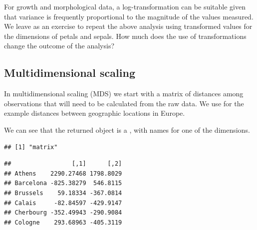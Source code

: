 \documentclass[krantz2]{krantz}\usepackage{knitr}%
\begin{document}
\begin{playground}
For growth and morphological data, a log-transformation can be suitable given that variance is frequently proportional to the magnitude of the values measured. We leave as an exercise to repeat the above analysis using transformed values for the dimensions of petals and sepals. How much does the use of transformations change the outcome of the analysis?
\end{playground}

\subsection{Multidimensional scaling}\label{sec:stat:MDS}

In multidimensional scaling (MDS) we start with a matrix of distances among observations that will need to be calculated from the raw data. We use for the example distances between geographic locations in Europe.

\begin{knitrout}\footnotesize
{}\color{fgcolor}\begin{kframe}
\begin{alltt}
 \hlkwb{<-} 
\end{alltt}
\end{kframe}
\end{knitrout}

We can see that the returned object  is a , with names for one of the dimensions.

\begin{knitrout}\footnotesize
{}\color{fgcolor}\begin{kframe}
\begin{alltt}
\end{alltt}
\begin{verbatim}
## [1] "matrix"
\end{verbatim}
\begin{alltt}
\end{alltt}
\begin{verbatim}
##                 [,1]      [,2]
## Athens    2290.27468 1798.8029
## Barcelona -825.38279  546.8115
## Brussels    59.18334 -367.0814
## Calais     -82.84597 -429.9147
## Cherbourg -352.49943 -290.9084
## Cologne    293.68963 -405.3119
\end{verbatim}
\end{kframe}
\end{knitrout}
\end{document}
